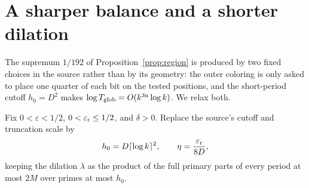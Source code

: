 \documentclass[11pt]{article}
\begin{document}
\section{A sharper balance and a shorter dilation}\label{sec:sharpened}
The supremum $1/192$ of Proposition~\ref{prop:region} is produced by
two fixed choices in the source rather than by its geometry: the outer
coloring is only asked to place one quarter of each bit on the tested
positions, and the short-period cutoff $h_0=D^2$ makes
$\log T_{\rm glob}=O(k^{3a}\log k)$. We relax both.

Fix $0<\varepsilon<1/2$, $0<\varepsilon_{\rm r}\le1/2$, and $\delta>0$.
Replace the source's cutoff and truncation scale by
\[
 h_0=D\lceil\log k\rceil^2,\qquad \eta=\frac{\varepsilon_{\rm r}}{8D},
\]
keeping the dilation $\lambda$ as the product of the full primary parts
of every period at most $2M$ over primes at most $h_0$.
\end{document}
